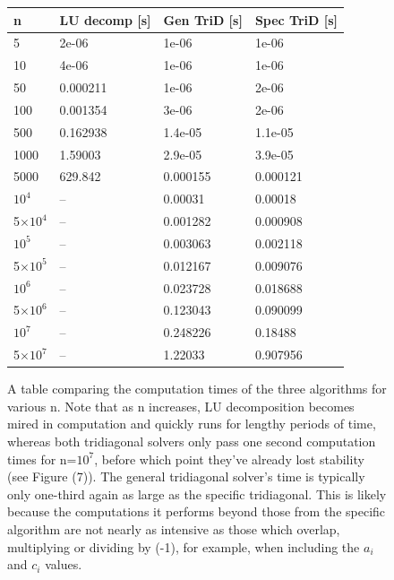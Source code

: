 \documentclass[11pt,a4paper]{article}
\begin{document}
\begin{figure}
\centering
\begin{tabular}{| l | l | l | l |}
\hline
n & LU decomp [s] & Gen TriD [s] & Spec TriD [s] \\ \hline
5 & 2e-06 & 1e-06 & 1e-06 \\ \hline
10 & 4e-06 & 1e-06 & 1e-06 \\ \hline
50 & 0.000211 & 1e-06 & 2e-06 \\ \hline
100 & 0.001354 & 3e-06 & 2e-06 \\ \hline
500 & 0.162938 & 1.4e-05 & 1.1e-05 \\ \hline
1000 & 1.59003 & 2.9e-05 & 3.9e-05 \\ \hline
5000 & 629.842 & 0.000155 & 0.000121 \\ \hline
$10^4$ & -- & 0.00031 & 0.00018 \\ \hline
5$\times10^4$ & -- & 0.001282 & 0.000908 \\ \hline 
$10^5$ & -- & 0.003063 & 0.002118 \\ \hline
5$\times10^5$ & -- & 0.012167 & 0.009076 \\ \hline
$10^6$ & -- & 0.023728 & 0.018688 \\ \hline
5$\times10^6$ & -- & 0.123043 & 0.090099 \\ \hline
$10^7$ & -- & 0.248226 & 0.18488 \\ \hline
5$\times10^7$ & -- & 1.22033 & 0.907956 \\ \hline
\end{tabular}
\caption{A table comparing the computation times of the three algorithms for various n. Note that as n increases, LU decomposition becomes mired in computation and quickly runs for lengthy periods of time, whereas both tridiagonal solvers only pass one second computation times for n=$10^7$, before which point they've already lost stability (see Figure (7)). The general tridiagonal solver's time is typically only one-third again as large as the specific tridiagonal. This is likely because the computations it performs beyond those from the specific algorithm are not nearly as intensive as those which overlap, multiplying or dividing by (-1), for example, when including the $a_i$ and $c_i$ values.}
\end{figure}   
\end{document}
